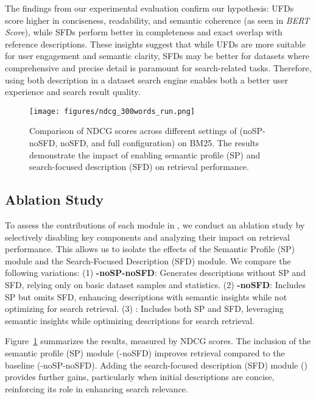 % 
The findings from our experimental evaluation confirm our hypothesis: UFDs score higher in conciseness, readability, and semantic coherence (as seen in \textit{BERT Score}), while SFDs perform better in completeness and exact overlap with reference descriptions. These insights suggest that while UFDs are more suitable for user engagement and semantic clarity, SFDs may be better for datasets where comprehensive and precise detail is paramount for search-related tasks. Therefore, using both description in a dataset search engine enables both a better user experience and search result quality.


\begin{figure}
  \centering
  \texttt{[image: figures/ndcg\_300words\_run.png]}
  \vspace{-0.3cm}
  \caption{Comparison of NDCG scores across different settings of \SystemName (noSP-noSFD, noSFD, and full configuration) on BM25. The results demonstrate the impact of enabling semantic profile (SP) and search-focused description (SFD) on retrieval performance. 
  }
  \label{fig:ablation_different_settings}
  \vspace{-0.3cm}
\end{figure}


\vspace{-.3cm}
\subsection{Ablation Study}

To assess the contributions of each module in \SystemName, we conduct an ablation study by selectively disabling key components and analyzing their impact on retrieval performance. This allows us to isolate the effects of the Semantic Profile (SP) module and the Search-Focused Description (SFD) module.  
% 
We compare the following variations:  
% 
(1) \textbf{\SystemName-noSP-noSFD}: Generates descriptions without SP and SFD, relying only on basic dataset samples and statistics.  
% 
(2) \textbf{\SystemName-noSFD}: Includes SP but omits SFD, enhancing descriptions with semantic insights while not optimizing for search retrieval.  
% 
(3) \textbf{\SystemName}: Includes both SP and SFD, leveraging semantic insights while optimizing descriptions for search retrieval.




% 
Figure~\ref{fig:ablation_different_settings} summarizes the results, 
measured by NDCG scores.  
%  
The inclusion of the semantic profile (SP) module (\SystemName-noSFD) improves retrieval compared to the baseline (\SystemName-noSP-noSFD).  
%  
Adding the search-focused description (SFD) module (\SystemName) provides further gains, particularly when initial descriptions are concise, reinforcing its role in enhancing search relevance.  

